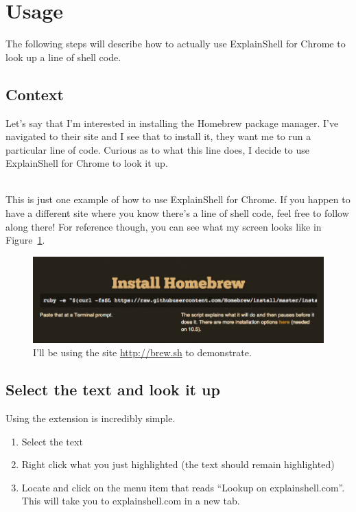 \documentclass[11pt]{article}
\begin{document}
\section{Usage}
The following steps will describe how to actually use ExplainShell for Chrome to look up a line of shell code.

\subsection{Context}
Let's say that I'm interested in installing the Homebrew package manager. I've navigated to their site and I see that to install it, they want me to run a particular line of code. Curious as to what this line does, I decide to use ExplainShell for Chrome to look it up.

\mbox{} \\
\noindent
This is just one example of how to use ExplainShell for Chrome. If you happen to have a different site where you know there's a line of shell code, feel free to follow along there! For reference though, you can see what my screen looks like in Figure~\ref{brew}.

\vspace{0.2in}
\begin{figure}[H]
  \begin{center}
    \includegraphics[width=\textwidth, height=\textheight, keepaspectratio]{05brew}
  \end{center}
  \caption{I'll be using the site \url{http://brew.sh} to demonstrate.}
  \label{brew}
\end{figure}
\vspace{0.2in}

\subsection{Select the text and look it up}
Using the extension is incredibly simple. 

\begin{enumerate}
  \item Select the text
  \item Right click what you just highlighted (the text should remain highlighted)
  \item Locate and click on the menu item that reads ``Lookup on explainshell.com''. This will take you to explainshell.com in a new tab.
\end{enumerate}
\end{document}
